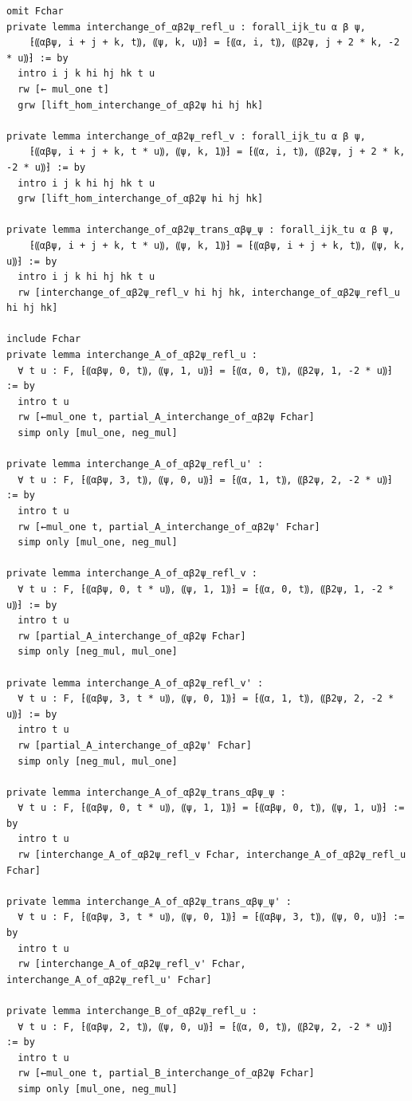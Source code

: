 \begin{Verbatim}
omit Fchar
private lemma interchange_of_αβ2ψ_refl_u : forall_ijk_tu α β ψ,
    ⁅⸨αβψ, i + j + k, t⸩, ⸨ψ, k, u⸩⁆ = ⁅⸨α, i, t⸩, ⸨β2ψ, j + 2 * k, -2 * u⸩⁆ := by
  intro i j k hi hj hk t u
  rw [← mul_one t]
  grw [lift_hom_interchange_of_αβ2ψ hi hj hk]

private lemma interchange_of_αβ2ψ_refl_v : forall_ijk_tu α β ψ,
    ⁅⸨αβψ, i + j + k, t * u⸩, ⸨ψ, k, 1⸩⁆ = ⁅⸨α, i, t⸩, ⸨β2ψ, j + 2 * k, -2 * u⸩⁆ := by
  intro i j k hi hj hk t u
  grw [lift_hom_interchange_of_αβ2ψ hi hj hk]

private lemma interchange_of_αβ2ψ_trans_αβψ_ψ : forall_ijk_tu α β ψ,
    ⁅⸨αβψ, i + j + k, t * u⸩, ⸨ψ, k, 1⸩⁆ = ⁅⸨αβψ, i + j + k, t⸩, ⸨ψ, k, u⸩⁆ := by
  intro i j k hi hj hk t u
  rw [interchange_of_αβ2ψ_refl_v hi hj hk, interchange_of_αβ2ψ_refl_u hi hj hk]

include Fchar
private lemma interchange_A_of_αβ2ψ_refl_u :
  ∀ t u : F, ⁅⸨αβψ, 0, t⸩, ⸨ψ, 1, u⸩⁆ = ⁅⸨α, 0, t⸩, ⸨β2ψ, 1, -2 * u⸩⁆ := by
  intro t u
  rw [←mul_one t, partial_A_interchange_of_αβ2ψ Fchar]
  simp only [mul_one, neg_mul]

private lemma interchange_A_of_αβ2ψ_refl_u' :
  ∀ t u : F, ⁅⸨αβψ, 3, t⸩, ⸨ψ, 0, u⸩⁆ = ⁅⸨α, 1, t⸩, ⸨β2ψ, 2, -2 * u⸩⁆ := by
  intro t u
  rw [←mul_one t, partial_A_interchange_of_αβ2ψ' Fchar]
  simp only [mul_one, neg_mul]

private lemma interchange_A_of_αβ2ψ_refl_v :
  ∀ t u : F, ⁅⸨αβψ, 0, t * u⸩, ⸨ψ, 1, 1⸩⁆ = ⁅⸨α, 0, t⸩, ⸨β2ψ, 1, -2 * u⸩⁆ := by
  intro t u
  rw [partial_A_interchange_of_αβ2ψ Fchar]
  simp only [neg_mul, mul_one]

private lemma interchange_A_of_αβ2ψ_refl_v' :
  ∀ t u : F, ⁅⸨αβψ, 3, t * u⸩, ⸨ψ, 0, 1⸩⁆ = ⁅⸨α, 1, t⸩, ⸨β2ψ, 2, -2 * u⸩⁆ := by
  intro t u
  rw [partial_A_interchange_of_αβ2ψ' Fchar]
  simp only [neg_mul, mul_one]

private lemma interchange_A_of_αβ2ψ_trans_αβψ_ψ :
  ∀ t u : F, ⁅⸨αβψ, 0, t * u⸩, ⸨ψ, 1, 1⸩⁆ = ⁅⸨αβψ, 0, t⸩, ⸨ψ, 1, u⸩⁆ := by
  intro t u
  rw [interchange_A_of_αβ2ψ_refl_v Fchar, interchange_A_of_αβ2ψ_refl_u Fchar]

private lemma interchange_A_of_αβ2ψ_trans_αβψ_ψ' :
  ∀ t u : F, ⁅⸨αβψ, 3, t * u⸩, ⸨ψ, 0, 1⸩⁆ = ⁅⸨αβψ, 3, t⸩, ⸨ψ, 0, u⸩⁆ := by
  intro t u
  rw [interchange_A_of_αβ2ψ_refl_v' Fchar, interchange_A_of_αβ2ψ_refl_u' Fchar]

private lemma interchange_B_of_αβ2ψ_refl_u :
  ∀ t u : F, ⁅⸨αβψ, 2, t⸩, ⸨ψ, 0, u⸩⁆ = ⁅⸨α, 0, t⸩, ⸨β2ψ, 2, -2 * u⸩⁆ := by
  intro t u
  rw [←mul_one t, partial_B_interchange_of_αβ2ψ Fchar]
  simp only [mul_one, neg_mul]


\end{Verbatim}
